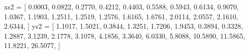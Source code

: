 \documentclass[
  letterpaper,
  DIV=11,
  numbers=noendperiod]{scrartcl}
\newenvironment{Shaded}{\begin{snugshade}}{\end{snugshade}}
\newcommand{\FloatTok}[1]{\textcolor[rgb]{0.68,0.00,0.00}{#1}}
\newcommand{\NormalTok}[1]{\textcolor[rgb]{0.00,0.23,0.31}{#1}}
\newcommand{\OperatorTok}[1]{\textcolor[rgb]{0.37,0.37,0.37}{#1}}
\begin{document}
\begin{Shaded}
\begin{Highlighting}[]
\NormalTok{xs2 }\OperatorTok{=}\NormalTok{ [}
    \FloatTok{0.0003}\NormalTok{,}
    \FloatTok{0.0822}\NormalTok{,}
    \FloatTok{0.2770}\NormalTok{,}
    \FloatTok{0.4212}\NormalTok{,}
    \FloatTok{0.4403}\NormalTok{,}
    \FloatTok{0.5588}\NormalTok{,}
    \FloatTok{0.5943}\NormalTok{,}
    \FloatTok{0.6134}\NormalTok{,}
    \FloatTok{0.9070}\NormalTok{,}
    \FloatTok{1.0367}\NormalTok{,}
    \FloatTok{1.1903}\NormalTok{,}
    \FloatTok{1.2511}\NormalTok{,}
    \FloatTok{1.2519}\NormalTok{,}
    \FloatTok{1.2576}\NormalTok{,}
    \FloatTok{1.6165}\NormalTok{,}
    \FloatTok{1.6761}\NormalTok{,}
    \FloatTok{2.0114}\NormalTok{,}
    \FloatTok{2.0557}\NormalTok{,}
    \FloatTok{2.1610}\NormalTok{,}
    \FloatTok{2.6344}\NormalTok{,}
\NormalTok{]}
\NormalTok{ys2 }\OperatorTok{=}\NormalTok{ [}
    \FloatTok{1.1017}\NormalTok{,}
    \FloatTok{1.5021}\NormalTok{,}
    \FloatTok{0.3844}\NormalTok{,}
    \FloatTok{1.3251}\NormalTok{,}
    \FloatTok{1.7206}\NormalTok{,}
    \FloatTok{1.9453}\NormalTok{,}
    \FloatTok{0.3894}\NormalTok{,}
    \FloatTok{0.3328}\NormalTok{,}
    \FloatTok{1.2887}\NormalTok{,}
    \FloatTok{3.1239}\NormalTok{,}
    \FloatTok{2.1778}\NormalTok{,}
    \FloatTok{3.1078}\NormalTok{,}
    \FloatTok{4.1856}\NormalTok{,}
    \FloatTok{3.3640}\NormalTok{,}
    \FloatTok{6.0330}\NormalTok{,}
    \FloatTok{5.8088}\NormalTok{,}
    \FloatTok{10.5890}\NormalTok{,}
    \FloatTok{11.5865}\NormalTok{,}
    \FloatTok{11.8221}\NormalTok{,}
    \FloatTok{26.5077}\NormalTok{,}
\NormalTok{]}
\end{Highlighting}
\end{Shaded}
\end{document}
